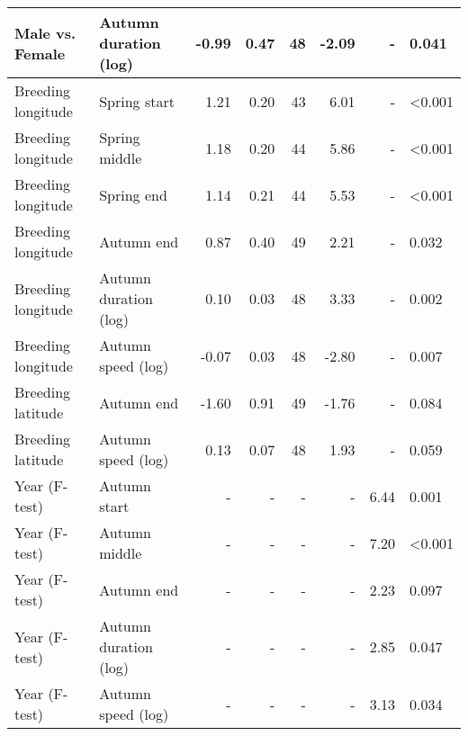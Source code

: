 \documentclass[a4paper, nobind]{templates/ociamthesis}
\begin{document}
\begin{table}[t]
\begin{tabular}{l|l|r|r|r|r|r|l}
\hline
Male vs. Female & Autumn duration (log) & -0.99 & 0.47 & 48 & -2.09 & - & 0.041\\
\hline
Breeding longitude & Spring start & 1.21 & 0.20 & 43 & 6.01 & - & <0.001\\
\hline
Breeding longitude & Spring middle & 1.18 & 0.20 & 44 & 5.86 & - & <0.001\\
\hline
Breeding longitude & Spring end & 1.14 & 0.21 & 44 & 5.53 & - & <0.001\\
\hline
Breeding longitude & Autumn end & 0.87 & 0.40 & 49 & 2.21 & - & 0.032\\
\hline
Breeding longitude & Autumn duration (log) & 0.10 & 0.03 & 48 & 3.33 & - & 0.002\\
\hline
Breeding longitude & Autumn speed (log) & -0.07 & 0.03 & 48 & -2.80 & - & 0.007\\
\hline
Breeding latitude & Autumn end & -1.60 & 0.91 & 49 & -1.76 & - & 0.084\\
\hline
Breeding latitude & Autumn speed (log) & 0.13 & 0.07 & 48 & 1.93 & - & 0.059\\
\hline
Year (F-test) & Autumn start & - & - & - & - & 6.44 & 0.001\\
\hline
Year (F-test) & Autumn middle & - & - & - & - & 7.20 & <0.001\\
\hline
Year (F-test) & Autumn end & - & - & - & - & 2.23 & 0.097\\
\hline
Year (F-test) & Autumn duration (log) & - & - & - & - & 2.85 & 0.047\\
\hline
Year (F-test) & Autumn speed (log) & - & - & - & - & 3.13 & 0.034\\
\hline
\end{tabular}
\end{table}
\end{document}
